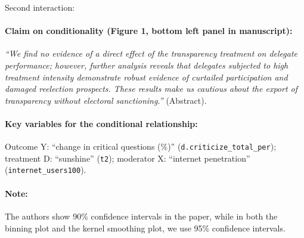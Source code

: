 \documentclass[12pt]{article}
\begin{document}
\clearpage


\noindent Second interaction:

\paragraph{Claim on conditionality (Figure 1, bottom left panel in manuscript):} \emph{``We find no evidence of a direct effect of the transparency treatment on delegate performance; however,
further analysis reveals that delegates subjected to high treatment intensity demonstrate robust evidence of curtailed participation and damaged reelection prospects. These results make us cautious about the export of transparency without electoral sanctioning.''} (Abstract). 

\paragraph{Key variables for the conditional relationship:} Outcome Y:
``change in critical questions (\%)'' (\texttt{d.criticize\_total\_per}); treatment D: ``sunshine'' (\texttt{t2}); moderator X: ``internet penetration''
(\texttt{internet\_users100}).

\paragraph{Note:} The authors show 90\% confidence intervals in the paper, while in both the binning plot and the kernel smoothing plot, we use 95\% confidence intervals.

\newpage
\end{document}
